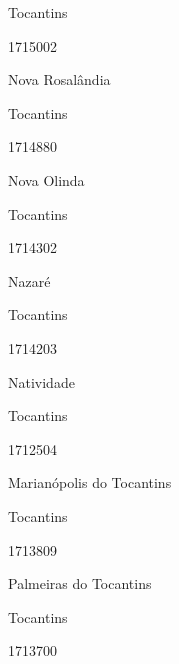\documentclass[
  letterpaper,
]{report}
\begin{document}
Tocantins

\n      

1715002

\n      

Nova Rosalândia

\n    

\n    

\n      

Tocantins

\n      

1714880

\n      

Nova Olinda

\n    

\n    

\n      

Tocantins

\n      

1714302

\n      

Nazaré

\n    

\n    

\n      

Tocantins

\n      

1714203

\n      

Natividade

\n    

\n    

\n      

Tocantins

\n      

1712504

\n      

Marianópolis do Tocantins

\n    

\n    

\n      

Tocantins

\n      

1713809

\n      

Palmeiras do Tocantins

\n    

\n    

\n      

Tocantins

\n      

1713700

\n      
\end{document}
